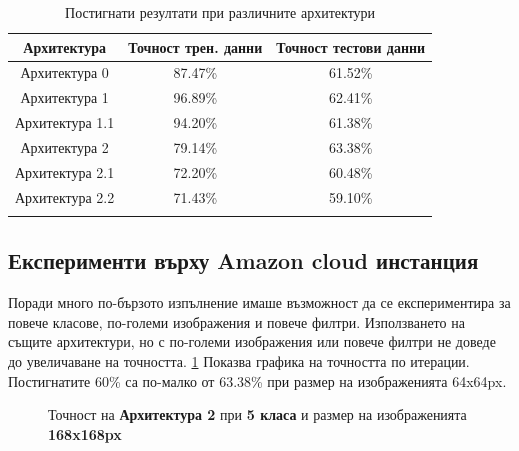 \begin{longtable}{ | c | c | c | }
\hline
\textbf{Архитектура} & \textbf{Точност трен. данни} & \textbf{Точност тестови данни} \\ \hline \hline
Архитектура 0 & 87.47\% & 61.52\% \\ \hline
Архитектура 1 & 96.89\% & 62.41\% \\ \hline
Архитектура 1.1 & 94.20\% & 61.38\% \\ \hline
Архитектура 2 & 79.14\% & 63.38\% \\ \hline
Архитектура 2.1 & 72.20\% & 60.48\% \\ \hline
Архитектура 2.2 & 71.43\% & 59.10\% \\ \hline
\caption{Постигнати резултати при различните архитектури}
\label{tab:architectures_results}
\end{longtable}


\subsection{Експерименти върху Amazon cloud инстанция}
Поради много по-бързото изпълнение имаше възможност да се експериментира за повече класове, по-големи изображения и повече филтри. Използването на същите архитектури, но с по-големи изображения или повече филтри не доведе до увеличаване на точността. \ref{plot:plt_arch2_168px} Показва графика на точността по итерации. Постигнатите 60\% са по-малко от 63.38\% при размер на изображенията 64x64px.

\begin{figure}[H]
\centering
{}
\caption{Точност на \textbf{Архитектура 2} при \textbf{5 класа} и размер на изображенията \textbf{168x168px}}
\label{plot:plt_arch2_168px}
\end{figure}

